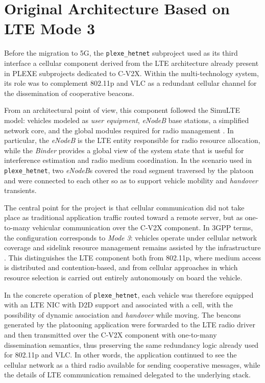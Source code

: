 \section{Original Architecture Based on LTE Mode 3}

Before the migration to 5G, the \texttt{plexe\_hetnet} subproject used as its third interface a cellular component derived from the LTE architecture already present in PLEXE subprojects dedicated to C-V2X. Within the multi-technology system, its role was to complement 802.11p and VLC as a redundant cellular channel for the dissemination of cooperative beacons.

From an architectural point of view, this component followed the SimuLTE model: vehicles modeled as \emph{user equipment}, \emph{eNodeB} base stations, a simplified network core, and the global modules required for radio management \cite{virdis2014simulte}. In particular, the \emph{eNodeB} is the LTE entity responsible for radio resource allocation, while the \emph{Binder} provides a global view of the system state that is useful for interference estimation and radio medium coordination. In the scenario used in \texttt{plexe\_hetnet}, two \emph{eNodeB}s covered the road segment traversed by the platoon and were connected to each other so as to support vehicle mobility and \emph{handover} transients.

The central point for the project is that cellular communication did not take place as traditional application traffic routed toward a remote server, but as one-to-many vehicular communication over the C-V2X component. In 3GPP terms, the configuration corresponds to \emph{Mode 3}: vehicles operate under cellular network coverage and sidelink resource management remains assisted by the infrastructure \cite{3gpp-21914-1400}. This distinguishes the LTE component both from 802.11p, where medium access is distributed and contention-based, and from cellular approaches in which resource selection is carried out entirely autonomously on board the vehicle.

In the concrete operation of \texttt{plexe\_hetnet}, each vehicle was therefore equipped with an LTE NIC with D2D support and associated with a cell, with the possibility of dynamic association and \emph{handover} while moving. The beacons generated by the platooning application were forwarded to the LTE radio driver and then transmitted over the C-V2X component with one-to-many dissemination semantics, thus preserving the same redundancy logic already used for 802.11p and VLC. In other words, the application continued to see the cellular network as a third radio available for sending cooperative messages, while the details of LTE communication remained delegated to the underlying stack.

